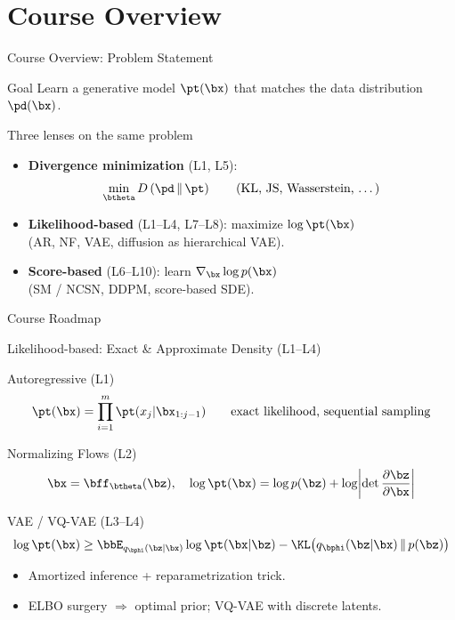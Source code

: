 \documentclass{beamer}
\begin{document}
\section{Course Overview}
\begin{frame}{Course Overview: Problem Statement}
	\begin{block}{Goal}
		Learn a generative model $\pt(\bx)$ that matches the data distribution $\pd(\bx)$.
	\end{block}
	\begin{block}{Three lenses on the same problem}
		\begin{itemize}
			\item \textbf{Divergence minimization} (L1, L5):
			\[
				\min_{\btheta} D\left(\pd \,\|\, \pt\right)
				\qquad (\text{KL, JS, Wasserstein, \dots})
			\]
			\vspace{-0.5cm}
			\item \textbf{Likelihood-based} (L1--L4, L7--L8): maximize $\log \pt(\bx)$ \\
			(AR, NF, VAE, diffusion as hierarchical VAE).
			\item \textbf{Score-based} (L6--L10): learn $\nabla_{\bx} \log p(\bx)$ \\
			(SM / NCSN, DDPM, score-based SDE).
		\end{itemize}
	\end{block}
\end{frame}
\begin{frame}{Course Roadmap}
	\renderTaxonomy{}
\end{frame}
\begin{frame}{Likelihood-based: Exact \& Approximate Density (L1--L4)}
	\begin{block}{Autoregressive (L1)}
		\vspace{-0.3cm}
		\[
			\pt(\bx)=\prod_{i=1}^m \pt(x_j | \bx_{1:j-1})
			\qquad \text{exact likelihood, sequential sampling}
		\]
	\end{block}
	\begin{block}{Normalizing Flows (L2)}
		\vspace{-0.3cm}
		\[
			\bx=\bff_{\btheta}(\bz),
			\quad
			\log \pt(\bx)=\log p(\bz)+\log\!\left|\det \frac{\partial \bz}{\partial \bx}\right|
		\]
	\end{block}
	\begin{block}{VAE / VQ-VAE (L3--L4)}
		\vspace{-0.3cm}
		\[
			\log \pt(\bx)\ge \bbE_{q_{\bphi}(\bz|\bx)}\log \pt(\bx|\bz)-\KL\bigl(q_{\bphi}(\bz|\bx)\,\|\,p(\bz)\bigr)
		\]
		\vspace{-0.5cm}
		\begin{itemize}
			\item Amortized inference + reparametrization trick.
			\item ELBO surgery $\Rightarrow$ optimal prior; VQ-VAE with discrete latents.
		\end{itemize}
	\end{block}
\end{frame}
\end{document}
